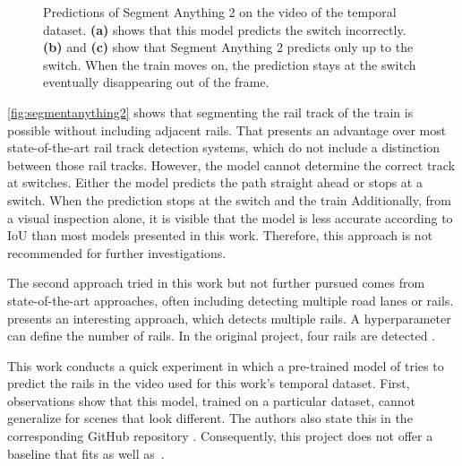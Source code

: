 \begin{figure}[H]
\begin{subfigure}{0.328\textwidth}
        \caption{}
        \label{fig:segmentanything2_c}
    \end{subfigure}
    \caption{Predictions of Segment Anything 2 \cite{segmentAnything22024} on the video of the temporal dataset. \textbf{(a)} shows that this model predicts the switch incorrectly. \textbf{(b)} and \textbf{(c)} show that Segment Anything 2 predicts only up to the switch. When the train moves on, the prediction stays at the switch eventually disappearing out of the frame.}
    \label{fig:segmentanything2}
\end{figure}

\autoref{fig:segmentanything2} shows that segmenting the rail track of the train is possible without including adjacent rails.
That presents an advantage over most state-of-the-art rail track detection systems, which do not include a distinction between those rail tracks.
However, the model cannot determine the correct track at switches.
Either the model predicts the path straight ahead or stops at a switch.
When the prediction stops at the switch and the train 
Additionally, from a visual inspection alone, it is visible that the model is less accurate according to IoU than most models presented in this work.
Therefore, this approach is not recommended for further investigations.

The second approach tried in this work but not further pursued comes from state-of-the-art approaches, often including detecting multiple road lanes or rails.
\cite{li2022rail} presents an interesting approach, which detects multiple rails.
A hyperparameter can define the number of rails.
In the original project, four rails are detected \cite{railNet2022GitHub}.

This work conducts a quick experiment in which a pre-trained model of \cite{li2022rail} tries to predict the rails in the video used for this work's temporal dataset.
First, observations show that this model, trained on a particular dataset, cannot generalize for scenes that look different.
The authors also state this in the corresponding GitHub repository \cite{railNet2022GitHub}.
Consequently, this project does not offer a baseline that fits as well as~\cite{tepNet2024}.

